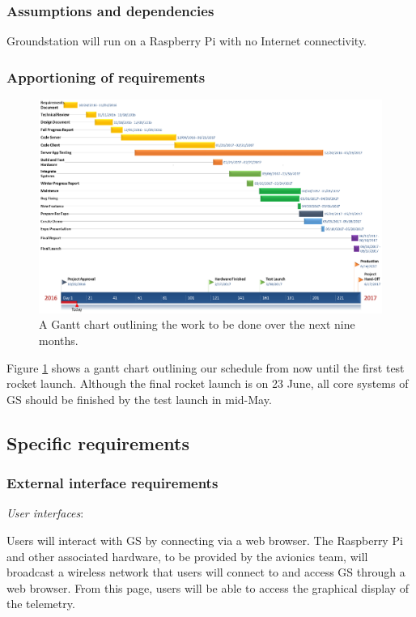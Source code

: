 \documentclass[10pt,draftclsnofoot,onecolumn]{IEEEtran}
\newcommand{\subsubsubsection}[1]{
	\hfill\break\textit{#1}:
}
\begin{document}
	\subsubsection{Assumptions and dependencies}
	Groundstation will run on a Raspberry Pi with no Internet connectivity.

	\subsubsection{Apportioning of requirements}

	\begin{figure}
		\includegraphics[width=\linewidth]{ganttchart.eps}
		\caption{A Gantt chart outlining the work to be done over the next nine months.}
		\label{fig:gantt}
	\end{figure}

	Figure \ref{fig:gantt} shows a gantt chart outlining our schedule from now until the first test rocket launch.
	Although the final rocket launch is on 23 June, all core systems of GS should be finished by the test launch in mid-May.

	\subsection{Specific requirements}

	\subsubsection{External interface requirements}
	\subsubsubsection{User interfaces}
	Users will interact with GS by connecting via a web browser. The Raspberry Pi and other associated hardware,
	to be provided by the avionics team,
	will broadcast a wireless network that users will connect to and access GS through a web browser.
	From this page, users will be able to access the graphical display of the telemetry.
	
\end{document}

